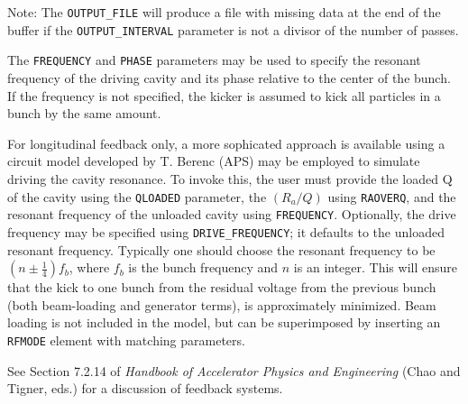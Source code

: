 Note: The \verb|OUTPUT_FILE| will produce a file with missing data at the end of
the buffer if the \verb|OUTPUT_INTERVAL| parameter is not a divisor of the number of passes.

The \verb|FREQUENCY| and \verb|PHASE| parameters may be used to specify the resonant frequency of 
the driving cavity and its phase relative to the center of the bunch.
If the frequency is not specified, the kicker is assumed to kick all particles in a bunch by the
same amount.

For longitudinal feedback only, a more sophicated approach is available using a
circuit model developed by T. Berenc (APS) may be employed to simulate driving the cavity resonance.
To invoke this, the user must provide the loaded Q of the cavity using the \verb|QLOADED| parameter,
the $(R_a/Q)$ using \verb|RAOVERQ|, and the resonant frequency of the unloaded 
cavity using \verb|FREQUENCY|. Optionally, the drive frequency may be specified using
\verb|DRIVE_FREQUENCY|; it defaults to the unloaded resonant frequency.
Typically one should choose the resonant frequency to be $(n\pm \frac{1}{4})f_b$, where
$f_b$ is the bunch frequency and $n$ is an integer.
This will ensure that the kick to one bunch from the residual voltage from the previous
bunch (both beam-loading and generator terms), is approximately minimized.
Beam loading is not included in the model, but can be superimposed by inserting an \verb|RFMODE| element
with matching parameters.

See Section 7.2.14 of {\em Handbook of Accelerator Physics and Engineering}
(Chao and Tigner, eds.) for a discussion of feedback systems.

